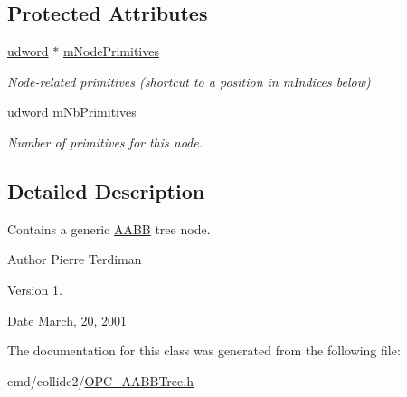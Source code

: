 \subsection*{Protected Attributes}
\begin{DoxyCompactItemize}
\item 
\hyperlink{IceTypes_8h_a44c6f1920ba5551225fb534f9d1a1733}{udword} $\ast$ \hyperlink{classAABBTreeNode_ac01ca7b2cdae3d84ace89e53b700f319}{m\+Node\+Primitives}\hypertarget{classAABBTreeNode_ac01ca7b2cdae3d84ace89e53b700f319}{}\label{classAABBTreeNode_ac01ca7b2cdae3d84ace89e53b700f319}

\begin{DoxyCompactList}\small\item\em Node-\/related primitives (shortcut to a position in m\+Indices below) \end{DoxyCompactList}\item 
\hyperlink{IceTypes_8h_a44c6f1920ba5551225fb534f9d1a1733}{udword} \hyperlink{classAABBTreeNode_ad06152e9431cd71da9d82ac60801b9a0}{m\+Nb\+Primitives}\hypertarget{classAABBTreeNode_ad06152e9431cd71da9d82ac60801b9a0}{}\label{classAABBTreeNode_ad06152e9431cd71da9d82ac60801b9a0}

\begin{DoxyCompactList}\small\item\em Number of primitives for this node. \end{DoxyCompactList}\end{DoxyCompactItemize}


\subsection{Detailed Description}
Contains a generic \hyperlink{classAABB}{A\+A\+BB} tree node.

\begin{DoxyAuthor}{Author}
Pierre Terdiman 
\end{DoxyAuthor}
\begin{DoxyVersion}{Version}
1. 
\end{DoxyVersion}
\begin{DoxyDate}{Date}
March, 20, 2001 
\end{DoxyDate}


The documentation for this class was generated from the following file\+:\begin{DoxyCompactItemize}
\item 
cmd/collide2/\hyperlink{OPC__AABBTree_8h}{O\+P\+C\+\_\+\+A\+A\+B\+B\+Tree.\+h}\end{DoxyCompactItemize}

